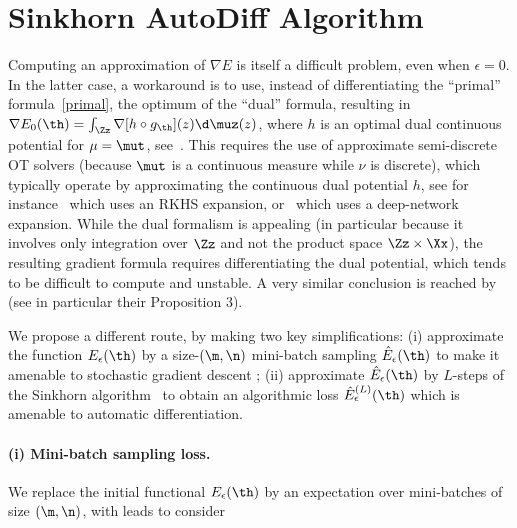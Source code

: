 

\section{Sinkhorn AutoDiff Algorithm}

Computing an approximation of $\nabla E$ is itself a difficult problem, even when $\epsilon=0$. 
%
In the latter case, a workaround is to use, instead of differentiating the ``primal'' formula~\eqref{primal}, the optimum of the ``dual'' formula, resulting in
$\nabla E_0(\th) = \int_\Zz \nabla[ h \circ g_\th ](z) \d\muz(z)$, where $h$ is an optimal dual continuous potential for $\mu=\mut$, see~\cite{WassersteinGAN}.  %
%
This requires the use of approximate semi-discrete OT solvers (because $\mut$ is a continuous measure while $\nu$ is discrete), which typically operate by approximating the continuous dual potential $h$, see for instance~\cite{2016-genevay-nips} which uses an RKHS expansion, or~\cite{WassersteinGAN} which uses a deep-network expansion.
%
While the dual formalism is appealing (in particular because it involves only integration over $\Zz$ and not the product space $\Zz \times \Xx$), the resulting gradient formula requires differentiating the dual potential, which tends to be difficult to compute and unstable. A very similar conclusion is reached by~\cite{Bousquet2017} (see in particular their Proposition 3).%

We propose a different route, by making two key simplifications: (i) approximate the function $E_\epsilon(\th)$ by a size-$(\m,\n)$ mini-batch sampling $\hat E_\epsilon(\th)$ to make it amenable to stochastic gradient descent ; (ii) approximate $\hat E_\epsilon(\th)$ by $L$-steps of the Sinkhorn algorithm~\cite{CuturiSinkhorn} to obtain an algorithmic loss $\hat E_\epsilon ^{(L)}(\th)$ which is amenable to automatic differentiation.


\paragraph{(i) Mini-batch sampling loss.}

We replace the initial functional $E_\epsilon(\th)$ by an expectation over mini-batches of size $(\m,\n)$, with leads to consider 
	
